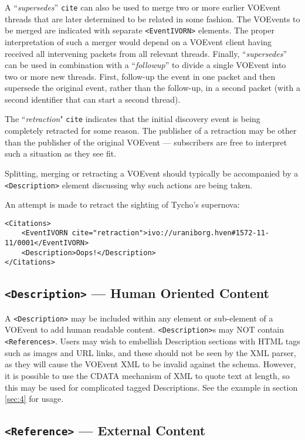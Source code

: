 \documentclass[11pt,a4paper]{ivoa}
\begin{document}
A ``\emph{supersedes}'' \texttt{cite} can also be used to merge two or more earlier
VOEvent threads that are later determined to be related in some fashion. The 
VOEvents to be merged are indicated with separate \texttt{<EventIVORN>} elements. 
The proper interpretation of such a merger would depend on a VOEvent client 
having received all intervening packets from all relevant threads. Finally, 
``\emph{supersedes}'' can be used in combination with a ``\emph{followup}'' to 
divide a single VOEvent into two or more new threads. First, follow-up the event
in one packet and then supersede the original event, rather than the follow-up,
in a second packet (with a second identifier that can start a second thread).

The ``\emph{retraction}" \texttt{cite} indicates that the initial discovery event 
is being completely retracted for some reason. The publisher of a retraction may
be other than the publisher of the original VOEvent --- subscribers are free to
interpret such a situation as they see fit.

Splitting, merging or retracting a VOEvent should typically be accompanied by a
\texttt{<Description>} element discussing why such actions are being taken. 

An attempt is made to retract the sighting of Tycho's supernova:
\begin{lstlisting}
<Citations>
    <EventIVORN cite="retraction">ivo://uraniborg.hven#1572-11-11/0001</EventIVORN>
    <Description>Oops!</Description>
</Citations>
\end{lstlisting}

\subsection{\texttt{<Description>} --- Human Oriented Content}
\label{sec:3.8}
A \texttt{<Description>} may be included within any element or sub-element of a
VOEvent to add human readable content. \texttt{<Description>}s may NOT contain \texttt{
<References>}. Users may wish to embellish Description sections with HTML tags 
such as images and URL links, and these should not be seen by the XML parser, as
they will cause the VOEvent XML to be invalid against the schema. However, it is
possible to use the CDATA mechanism of XML to quote text at length, so this may
be used for complicated tagged Descriptions. See the example in section
\ref{sec:4} for usage.

\subsection{\texttt{<Reference>} --- External Content}
\label{sec:3.9}
\end{document}
